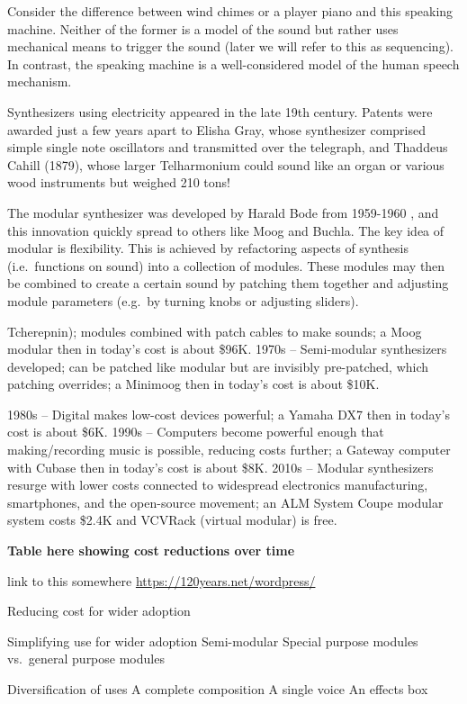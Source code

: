 \documentclass[
]{book}
\begin{document}
Consider the difference between wind chimes or a player piano and this speaking machine.
Neither of the former is a model of the sound but rather uses mechanical means to trigger the sound (later we will refer to this as sequencing).
In contrast, the speaking machine is a well-considered model of the human speech mechanism.

Synthesizers using electricity appeared in the late 19th century.
Patents were awarded just a few years apart to Elisha Gray, whose synthesizer comprised simple single note oscillators and transmitted over the telegraph, and Thaddeus Cahill (1879), whose larger Telharmonium could sound like an organ or various wood instruments but weighed 210 tons!

The modular synthesizer was developed by Harald Bode from 1959-1960 \citep{Bode1984}, and this innovation quickly spread to others like Moog and Buchla.
The key idea of modular is flexibility.
This is achieved by refactoring aspects of synthesis (i.e.~functions on sound) into a collection of modules.
These modules may then be combined to create a certain sound by patching them together and adjusting module parameters (e.g.~by turning knobs or adjusting sliders).

Tcherepnin); modules combined with patch cables to make sounds; a Moog modular then in today's cost is about \$96K.
1970s --
Semi-modular synthesizers developed; can be patched like modular but are invisibly pre-patched, which patching overrides; a Minimoog then in today's cost is about \$10K.

1980s --
Digital makes low-cost devices powerful; a Yamaha DX7 then in today's cost is about \$6K.
1990s --
Computers become powerful enough that making/recording music is possible, reducing costs further; a Gateway computer with Cubase then in today's cost is about \$8K.
2010s --
Modular synthesizers resurge with lower costs connected to widespread electronics manufacturing, smartphones, and the open-source movement; an ALM System Coupe modular system costs \$2.4K and VCVRack (virtual modular) is free.

\textbf{Table here showing cost reductions over time}

link to this somewhere
\url{https://120years.net/wordpress/}

Reducing cost for wider adoption

Simplifying use for wider adoption
Semi-modular
Special purpose modules vs.~general purpose modules

Diversification of uses
A complete composition
A single voice
An effects box
\end{document}
